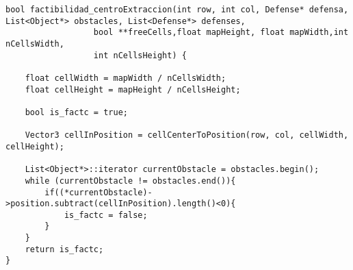 \begin{lstlisting}
bool factibilidad_centroExtraccion(int row, int col, Defense* defensa, List<Object*> obstacles, List<Defense*> defenses, 
                  bool **freeCells,float mapHeight, float mapWidth,int nCellsWidth,
                  int nCellsHeight) {

    float cellWidth = mapWidth / nCellsWidth;
    float cellHeight = mapHeight / nCellsHeight;

    bool is_factc = true;

    Vector3 cellInPosition = cellCenterToPosition(row, col, cellWidth, cellHeight);

    List<Object*>::iterator currentObstacle = obstacles.begin();
    while (currentObstacle != obstacles.end()){
        if((*currentObstacle)->position.subtract(cellInPosition).length()<0){
            is_factc = false;
        }
    }
    return is_factc;
}
\end{lstlisting}